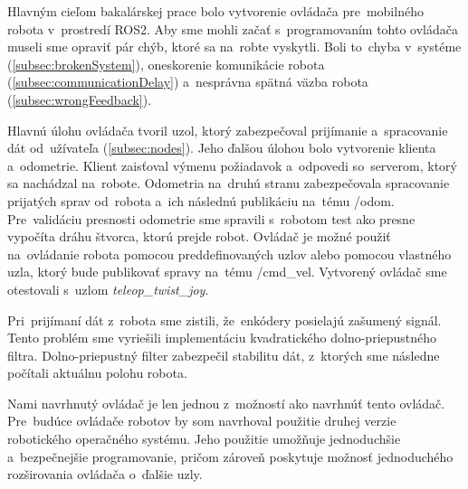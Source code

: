 
Hlavným cieľom bakalárskej prace bolo vytvorenie ovládača pre~mobilného robota v~prostredí ROS2. Aby sme mohli začať
s~programovaním tohto ovládača museli sme opraviť pár chýb, ktoré sa na~robte vyskytli. Boli to~chyba v~systéme
(\ref{subsec:brokenSystem}), oneskorenie komunikácie robota (\ref{subsec:communicationDelay}) a~nesprávna spätná väzba
robota (\ref{subsec:wrongFeedback}).

Hlavnú úlohu ovládača tvoril uzol, ktorý zabezpečoval prijímanie a~spracovanie dát od~užívateľa (\ref{subsec:nodes}).
Jeho ďalšou úlohou bolo vytvorenie klienta a~odometrie. Klient zaisťoval výmenu požiadavok a~odpovedi so~serverom,
ktorý sa nachádzal na~robote. Odometria na~druhú stranu zabezpečovala spracovanie prijatých sprav od~robota a~ich
následnú publikáciu na~tému /odom. Pre~validáciu presnosti odometrie sme spravili s~robotom test ako presne vypočíta
dráhu štvorca, ktorú prejde robot. Ovládač je možné použiť na~ovládanie robota pomocou preddefinovaných uzlov alebo
pomocou vlastného uzla, ktorý bude publikovať spravy na~tému /cmd\_vel. Vytvorený ovládač sme otestovali s~uzlom
\textit{teleop\_twist\_joy}.

Pri~prijímaní dát z~robota sme zistili, že~enkódery posielajú zašumený signál. Tento problém sme vyriešili implementáciu
kvadratického dolno-priepustného filtra. Dolno-priepustný filter zabezpečil stabilitu dát, z~ktorých sme následne počítali
aktuálnu polohu robota.

Nami navrhnutý ovládač je len jednou z~možností ako navrhnúť tento ovládač. Pre~budúce ovládače robotov by som navrhoval
použitie druhej verzie robotického operačného systému. Jeho použitie umožňuje jednoduchšie a~bezpečnejšie programovanie,
pričom zároveň poskytuje možnosť jednoduchého rozširovania ovládača o~ďalšie uzly.

